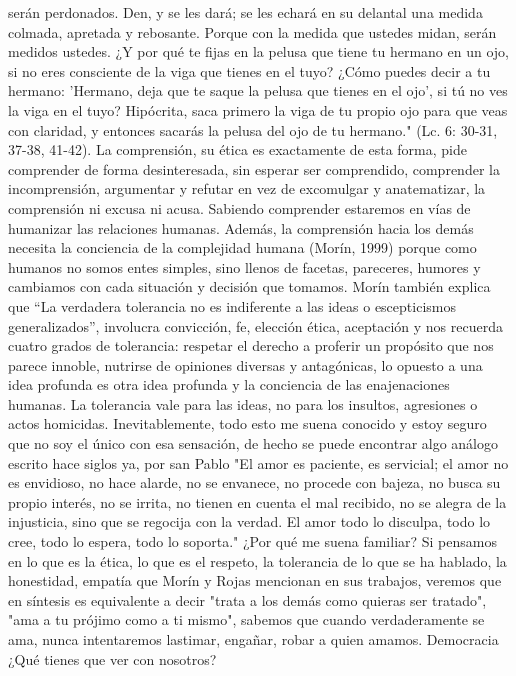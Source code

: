 serán perdonados. Den, y se les dará; se les echará en su delantal una medida colmada, apretada y rebosante. Porque con la medida que ustedes midan, serán medidos ustedes. ¿Y por qué te fijas en la pelusa que tiene tu hermano en un ojo, si no eres consciente de la viga que tienes en el tuyo? ¿Cómo puedes decir a tu hermano: 'Hermano, deja que te saque la pelusa que tienes en el ojo', si tú no ves la viga en el tuyo? Hipócrita, saca primero la viga de tu propio ojo para que veas con claridad, y entonces sacarás la pelusa del ojo de tu hermano." (Lc. 6: 30-31, 37-38, 41-42).
La comprensión, su ética es exactamente de esta forma, pide comprender de forma desinteresada, sin esperar ser comprendido, comprender la incomprensión, argumentar y refutar en vez de excomulgar y anatematizar, la comprensión ni excusa ni acusa. Sabiendo comprender estaremos en vías de humanizar las relaciones humanas. Además, la comprensión hacia los demás necesita la conciencia de la complejidad humana (Morín, 1999) porque como humanos no somos entes simples, sino llenos de facetas, pareceres, humores y cambiamos con cada situación y decisión que tomamos.
Morín también explica que “La verdadera tolerancia no es indiferente a las ideas o escepticismos generalizados”, involucra convicción, fe, elección ética, aceptación y nos recuerda cuatro grados de tolerancia: respetar el derecho a proferir un propósito que nos parece innoble, nutrirse de opiniones diversas y antagónicas, lo opuesto a una idea profunda es otra idea profunda y la conciencia de las enajenaciones humanas. La tolerancia vale para las ideas, no para los insultos, agresiones o actos homicidas.
Inevitablemente, todo esto me suena conocido y estoy seguro que no soy el único con esa sensación, de hecho se puede encontrar algo análogo escrito hace siglos ya, por san Pablo "El amor es paciente, es servicial; el amor no es envidioso, no hace alarde, no se envanece, no procede con bajeza, no busca su propio interés, no se irrita, no tienen en cuenta el mal recibido, no se alegra de la injusticia, sino que se regocija con la verdad. El amor todo lo disculpa, todo lo cree, todo lo espera, todo lo soporta." ¿Por qué me suena familiar? Si pensamos en lo que es la ética, lo que es el respeto, la tolerancia de lo que se ha hablado, la honestidad, empatía que Morín y Rojas mencionan en sus trabajos, veremos que en síntesis es equivalente a decir "trata a los demás como quieras ser tratado", "ama a tu prójimo como a ti mismo", sabemos que cuando verdaderamente se ama, nunca intentaremos lastimar, engañar, robar a quien amamos.
Democracia ¿Qué tienes que ver con nosotros?
